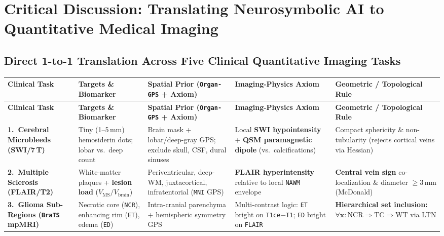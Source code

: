 \documentclass[10pt,a4paper]{article}
\begin{document}
\section{Critical Discussion: Translating Neurosymbolic AI to Quantitative Medical Imaging}

\subsection{Direct 1-to-1 Translation Across Five Clinical Quantitative Imaging Tasks}

{\scriptsize
\renewcommand{\arraystretch}{1.24}
\begin{xltabular}{\textwidth}{L{2.9cm} L{2.75cm} L{3.45cm} L{3.45cm} Y}
\toprule
{}\textbf{Clinical Task} & \textbf{Targets \& Biomarker} & \textbf{Spatial Prior (\texttt{Organ-GPS} + Axiom)} & \textbf{Imaging-Physics Axiom} & \textbf{Geometric / Topological Rule} \\
\midrule
\endfirsthead
\toprule
{}\textbf{Clinical Task} & \textbf{Targets \& Biomarker} & \textbf{Spatial Prior (\texttt{Organ-GPS} + Axiom)} & \textbf{Imaging-Physics Axiom} & \textbf{Geometric / Topological Rule} \\
\midrule
\endhead
\bottomrule
\endfoot
\textbf{1.\ Cerebral Microbleeds (SWI/7\,T)} & Tiny (1--5\,mm) hemosiderin dots; lobar vs.\ deep count & Brain mask + lobar/deep-gray GPS; exclude skull, CSF, dural sinuses & Local \textbf{SWI hypointensity} + \textbf{QSM paramagnetic dipole} (vs.\ calcifications) & Compact sphericity \& non-tubularity (rejects cortical veins via Hessian) \\
\textbf{2.\ Multiple Sclerosis (FLAIR/T2)} & White-matter plaques + \textbf{lesion load} ($V_{\text{MS}}/V_{\text{brain}}$) & Periventricular, deep-WM, juxtacortical, infratentorial (\texttt{MNI} GPS) & \textbf{FLAIR hyperintensity} relative to local \texttt{NAWM} envelope & \textbf{Central vein sign} co-localization \& diameter $\ge 3\,\text{mm}$ (McDonald) \\
\textbf{3.\ Glioma Sub-Regions (\texttt{BraTS} mpMRI)} & Necrotic core (\texttt{NCR}), enhancing rim (\texttt{ET}), edema (\texttt{ED}) & Intra-cranial parenchyma + hemispheric symmetry GPS & Multi-contrast logic: \texttt{ET} bright on \texttt{T1ce$-$T1}; \texttt{ED} bright on \texttt{FLAIR} & \textbf{Hierarchical set inclusion:} $\forall \mathbf{x}: \text{NCR} \Rightarrow \text{TC} \Rightarrow \text{WT}$ via LTN \\

\end{xltabular}}
\end{document}
